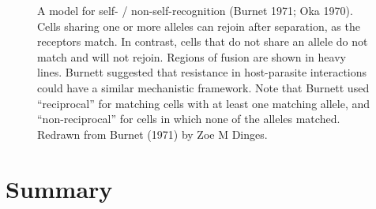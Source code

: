 \documentclass[
  letterpaper,
]{book}
\begin{document}
\begin{figure}


\caption[A model for self- / non-self-recognition]{\label{fig-4.6}A
model for self- / non-self-recognition (Burnet 1971; Oka 1970). Cells
sharing one or more alleles can rejoin after separation, as the
receptors match. In contrast, cells that do not share an allele do not
match and will not rejoin. Regions of fusion are shown in heavy lines.
Burnett suggested that resistance in host-parasite interactions could
have a similar mechanistic framework. Note that Burnett used
``reciprocal'' for matching cells with at least one matching allele, and
``non-reciprocal'' for cells in which none of the alleles matched.
Redrawn from Burnet (1971) by Zoe M Dinges.}

\end{figure}%

\section{Summary}\label{summary-3}
\end{document}

